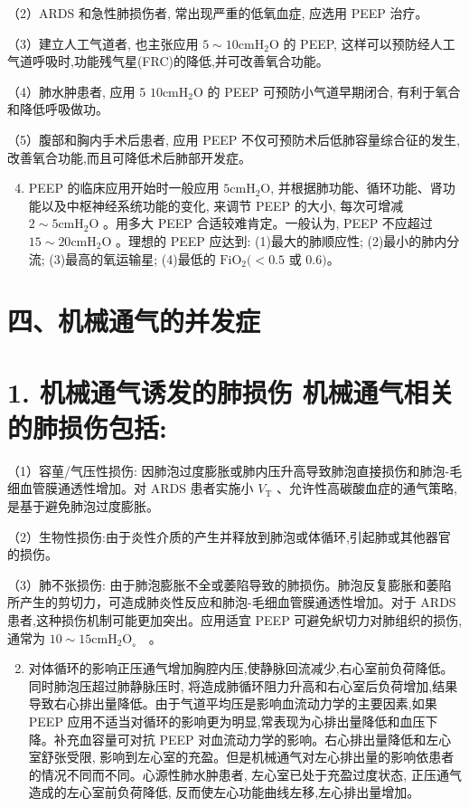 \documentclass[10pt]{article}
\begin{document}
（2）ARDS 和急性肺损伤者, 常出现严重的低氧血症, 应选用 PEEP 治疗。

（3）建立人工气道者, 也主张应用 $5 \sim 10 \mathrm{cmH}_{2} \mathrm{O}$ 的 PEEP, 这样可以预防经人工气道呼吸时,功能残气星(FRC)的降低,并可改善氧合功能。

（4）肺水肿患者, 应用 5 $10 \mathrm{cmH}_{2} \mathrm{O}$ 的 PEEP 可预防小气道早期闭合, 有利于氧合和降低呼吸做功。

（5）腹部和胸内手术后患者, 应用 PEEP 不仅可预防术后低肺容量综合征的发生, 改善氧合功能,而且可降低术后肺部开发症。

\begin{enumerate}
  \setcounter{enumi}{3}
  \item PEEP 的临床应用开始时一般应用 $5 \mathrm{cmH}_{2} \mathrm{O}$, 并根据肺功能、循环功能、肾功能以及中枢神经系统功能的变化, 来调节 PEEP 的大小, 每次可增减 $2 \sim 5 \mathrm{cmH}_{2} \mathrm{O}$ 。用多大 PEEP 合适较难肯定。一般认为, PEEP 不应超过 $15 \sim 20 \mathrm{cmH}_{2} \mathrm{O}$ 。理想的 PEEP 应达到: (1)最大的肺顺应性; (2)最小的肺内分流; (3)最高的氧运输星; (4)最低的 $\mathrm{FiO}_{2}(<0.5$ 或 0.6$) 。$
\end{enumerate}

\section*{四、机械通气的并发症}
\section*{1. 机械通气诱发的肺损伤 机械通气相关的肺损伤包括:}
（1）容荲/气压性损伤: 因肺泡过度膨胀或肺内压升高导致肺泡直接损伤和肺泡-毛细血管膜通透性增加。对 ARDS 患者实施小 $V_{\mathrm{T}}$ 、允许性高碳酸血症的通气策略, 是基于避免肺泡过度膨胀。

（2）生物性损伤:由于炎性介质的产生并释放到肺泡或体循环,引起肺或其他器官的损伤。

（3）肺不张损伤: 由于肺泡膨胀不全或萎陷导致的肺损伤。肺泡反复膨胀和萎陷所产生的剪切力，可造成肺炎性反应和肺泡-毛细血管膜通透性增加。对于 ARDS 患者,这种损伤机制可能更加突出。应用适宜 PEEP 可避免䋇切力对肺组织的损伤, 通常为 $10 \sim 15 \mathrm{cmH}_{2} \mathrm{O}_{\text {。 }}$ 。

\begin{enumerate}
  \setcounter{enumi}{1}
  \item 对体循环的影响正压通气增加胸腔内压,使静脉回流减少,右心室前负荷降低。同时肺泡压超过肺静脉压时, 将造成肺循环阻力升高和右心室后负荷增加,结果导致右心排出量降低。由于气道平均压是影响血流动力学的主要因素,如果 PEEP 应用不适当对循环的影响更为明显,常表现为心排出量降低和血压下降。补充血容量可对抗 PEEP 对血流动力学的影响。右心排出量降低和左心室舒张受限, 影响到左心室的充盈。但是机械通气对左心排出量的影响依患者的情况不同而不同。心源性肺水肿患者, 左心室已处于充盈过度状态, 正压通气造成的左心室前负荷降低, 反而使左心功能曲线左移,左心排出量增加。
\end{enumerate}
\end{document}
